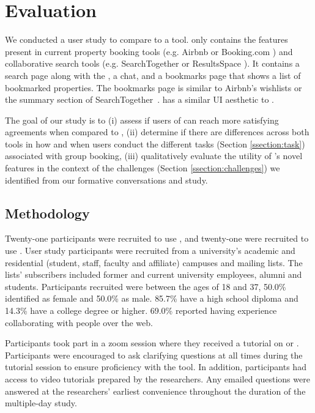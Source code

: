 \section{Evaluation} \label{section:evaluation}
We conducted a user study to compare \tool to a \baseline tool. \baseline only contains the features present in current property booking tools (e.g. Airbnb \cite{airbnb} or Booking.com \cite{booking}) and collaborative search tools (e.g. SearchTogether \cite{searchtogether} or ResultsSpace \cite{resultsspace}). It contains a search page along with the \collabQueryPanel, a chat, and a bookmarks page that shows a list of bookmarked properties. The bookmarks page is similar to Airbnb's wishlists or the summary section of SearchTogether~\cite{searchtogether}.  \baseline has a similar UI aesthetic to \tool.  

The goal of our study is to  (i) assess if users of \tool can reach more satisfying agreements when compared to \baseline, (ii) determine if there are differences across both tools in how and when users conduct the different tasks (Section \ref{ssection:task}) associated with group booking, (iii) qualitatively evaluate the utility of \tool's novel features in the context of the challenges (Section \ref{ssection:challenges}) we identified from our formative conversations and study.

\subsection{Methodology} \label{ssection:methodology}
Twenty-one participants were recruited to use \tool, and twenty-one were recruited to use \baseline. User study participants were recruited from a university's academic and residential (student, staff, faculty and affiliate) campuses and mailing lists. The lists' subscribers included former and current university employees, alumni and students. Participants recruited  were between the ages of 18 and 37, 50.0\% identified as female and 50.0\% as male.  85.7\% have a high school diploma and 14.3\% have a college degree or higher. 69.0\% reported having experience collaborating with people over the web. 

Participants took part in a zoom session where they received a tutorial on \tool or \baseline. Participants were encouraged to ask clarifying questions at all times during the tutorial session to ensure proficiency with the tool. In addition, participants had access to video tutorials prepared by the researchers. Any emailed questions were answered at the researchers' earliest convenience throughout the duration of the multiple-day study. 

